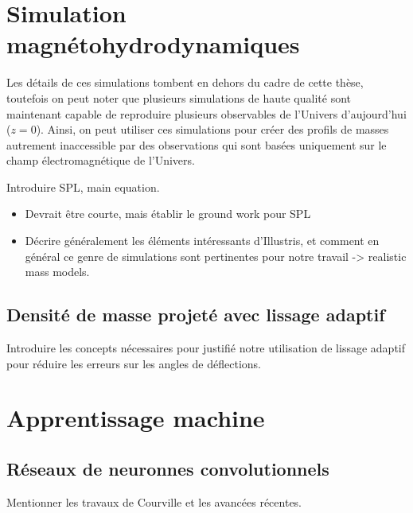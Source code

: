 \section{Simulation magnétohydrodynamiques}\label{sec:simulation magnetohydrodynamique}
Les détails de ces simulations tombent en dehors du cadre de cette thèse, 
toutefois on peut noter que plusieurs simulations de haute qualité sont maintenant 
capable de reproduire plusieurs observables de l'Univers d'aujourd'hui ($z=0$). 
Ainsi, on peut utiliser ces simulations pour créer des profils de masses 
autrement inaccessible par des observations qui sont basées uniquement 
sur le champ électromagnétique de l'Univers.

Introduire SPL, main equation.
\begin{itemize}
        \item Devrait être courte, mais établir le ground work pour 
                SPL
        \item Décrire généralement les éléments intéressants d'Illustris, et
                comment en général ce genre de simulations sont pertinentes 
                pour notre travail -> realistic mass models.
\end{itemize}

 
\subsection{Densité de masse projeté avec lissage adaptif}
Introduire les concepts nécessaires pour justifié notre utilisation de 
lissage adaptif pour réduire les erreurs sur les angles de déflections.


\section{Apprentissage machine}\label{sec:apprentissage machine}

\subsection{Réseaux de neuronnes convolutionnels}
Mentionner les travaux de Courville et les avancées récentes.

